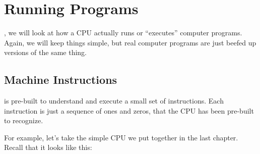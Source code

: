 \documentclass[../../../main.tex]{subfiles}
\begin{document}
\chapter{Running Programs}
\label{ch:running-programs}

, we will look at how a CPU actually runs or ``executes'' computer programs. Again, we will keep things simple, but real computer programs are just beefed up versions of the same thing.


\section{Machine Instructions}

 is pre-built to understand and execute a small set of instructions. Each instruction is just a sequence of ones and zeros, that the CPU has been pre-built to recognize.

For example, let's take the simple CPU we put together in the last chapter. Recall that it looks like this:
\end{document}

